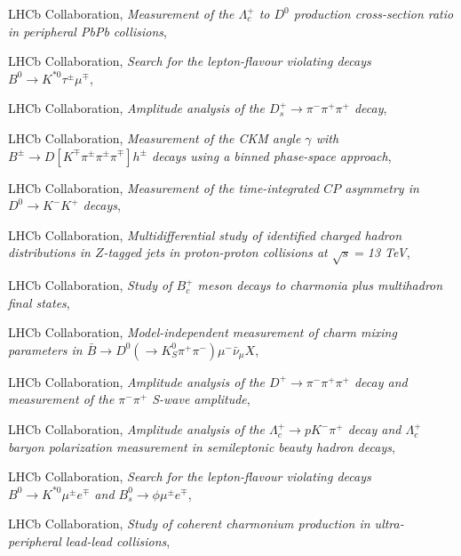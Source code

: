 \begin{cvcontent}
\begin{enumerate}[label={[\arabic*]}, leftmargin=1.5cm]
    \item LHCb Collaboration,
    \emph{Measurement of the $\Lambda_c^+$ to $D^0$ production cross-section ratio in peripheral PbPb collisions},
    \sloppy
    \item LHCb Collaboration,
    \emph{Search for the lepton-flavour violating decays $B^0 \to K^{*0} \tau^\pm \mu^\mp$},
    \item LHCb Collaboration,
    \emph{Amplitude analysis of the $D_s^+ \to \pi^- \pi^+ \pi^+$ decay},
    \item LHCb Collaboration,
    \emph{Measurement of the CKM angle $\gamma$ with $ B^\pm \to D \left [ K^\mp \pi^\pm \pi^\pm \pi^\mp \right ] h^\pm$ decays using a binned phase-space approach},
    \item LHCb Collaboration,
    \emph{Measurement of the time-integrated $CP$ asymmetry in $D^0\to K^- K^+$ decays},
    \item LHCb Collaboration,
    \emph{Multidifferential study of identified charged hadron distributions in $Z$-tagged jets in proton-proton collisions at $\sqrt{s}=$13 TeV},
    \item LHCb Collaboration,
    \emph{Study of $B_c^+$ meson decays to charmonia plus multihadron final states},
    \item LHCb Collaboration,
    \emph{Model-independent measurement of charm mixing parameters in $\bar{B} \rightarrow D^0 ( \rightarrow K_S^0 \pi^+ \pi^-) \mu^- \bar{\nu}_\mu X$},
    \item LHCb Collaboration,
    \emph{Amplitude analysis of the $D^+\to\pi^- \pi^+\pi^+$ decay and measurement of the $\pi^-\pi^+$ S-wave amplitude},
    \item LHCb Collaboration,
    \emph{Amplitude analysis of the $\Lambda^+_c\to pK^-\pi^+$ decay and $\Lambda^+_c$ baryon polarization measurement in semileptonic beauty hadron decays},
    \item LHCb Collaboration,
    \emph{Search for the lepton-flavour violating decays $B^0 \to K^{*0} \mu^\pm e^\mp$ and $B_s^0 \to \phi \mu^\pm e^\mp$},
    \item LHCb Collaboration,
    \emph{Study of coherent charmonium production in ultra-peripheral lead-lead collisions},

\end{enumerate}
\end{cvcontent}
